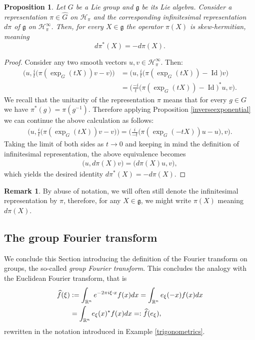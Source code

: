 \documentclass[12pt,oneside,a4paper]{book}
\numberwithin{equation}{section}     %
\theoremstyle{plain}
\newtheorem{proposition}[theorem]{Proposition}
\theoremstyle{definition}
\newtheorem{remark}[theorem]{Remark}
\DeclareMathOperator{\Id}{Id}
\newcommand{\R}{{\mathbb R}}
\newcommand{\Rn}{{\R}^n}
\begin{document}
\begin{proposition}\label{propertyinfrep}
	Let $G$ be a Lie group and $\mathfrak{g}$ be its Lie algebra. Consider a representation $\pi\in\widehat{G}$ on $\mathcal{H}_\pi$ and the corresponding infinitesimal representation $d\pi$ of $\mathfrak{g}$ on $\mathcal{H}_\pi^{\infty}$. Then, for every $X\in\mathfrak{g}$ the operator $\pi(X)$ is skew-hermitian, meaning 
	\[
	d\pi^*(X)=-d\pi(X).
	\]
\end{proposition}

\begin{proof}
	Consider any two smooth vectors $u,v\in\mathcal{H}_\pi^{\infty}$. Then:
	\begin{align*}
	\Big(u,\frac{i}{t}\big(\pi(\exp_{G}(tX))v-v\big)\Big)&=\Big(u,\frac{i}{t}\big(\pi(\exp_{G}(tX))-\Id\big)v\Big)\\
	&=\Big(\frac{-i}{t}\big(\pi(\exp_{G}(tX))-\Id\big)^*u,v\Big).
	\end{align*}
	We recall that the unitarity of the representation $\pi$ means that for every $g\in G$ we have $\pi^*(g)=\pi(g^{-1})$. Therefore applying Proposition \ref{inverseexponential} we can continue the above calculation as follows:
	\begin{align*}
	\Big(u,\frac{i}{t}\big(\pi(\exp_{G}(tX))v-v\big)\Big)=\Big(\frac{i}{-t}\big(\pi(\exp_{G}(-t X))u-u\big),v\Big).
	\end{align*}
	Taking the limit of both sides as $t\rightarrow0$ and keeping in mind the definition of infinitesimal representation, the above equivalence becomes
	\begin{align*}
	\big(u,d\pi(X)v\big)=\big(d\pi(X)u,v\big),
	\end{align*}
	which yields the desired identity $d\pi^*(X)=-d\pi(X)$.
\end{proof}
\begin{remark}
	By abuse of notation, we will often still denote the infinitesimal representation by $\pi$, therefore, for any $X\in\mathfrak g$, we might write $\pi(X)$ meaning $d\pi(X)$.
\end{remark}

\subsection{The group Fourier transform}\label{Sec:groupFouriertransform}

We conclude this Section introducing the definition of the Fourier transform on groups, the so-called 	\textit{group Fourier transform}. This concludes the analogy with the Euclidean Fourier transform, that is
\begin{align}\label{fouriertransformR}
\widehat{f}(\xi)&:=\int_{\Rn} e^{-2\pi i \xi\cdot x}f(x)dx=\int_{\Rn}e_\xi(-x)f(x)dx\notag\\
&=\int_{\Rn}e_\xi(x)^*f(x)dx=:\widehat{f}(e_\xi),
\end{align}
rewritten in the notation introduced in Example \ref{trigonometrics}.
\end{document}
